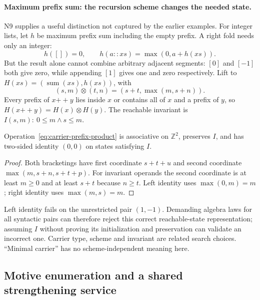 \paragraph{Maximum prefix sum: the recursion scheme changes the needed state.}
\label{sec:carrier-prefix-sum}
N9 supplies a useful distinction not captured by the earlier examples. For
integer lists, let $h$ be maximum prefix sum including the empty prefix. A
right fold needs only an integer:
\[
 h([])=0,\qquad h(a::xs)=\max(0,a+h(xs)).
\]
But the result alone cannot combine arbitrary adjacent segments: $[0]$ and
$[-1]$ both give zero, while appending $[1]$ gives one and zero respectively.
Lift to $H(xs)=(\operatorname{sum}(xs),h(xs))$, with
\begin{equation}\label{eq:carrier-prefix-product}
 (s,m)\otimes(t,n)=(s+t,\max(m,s+n)).
\end{equation}
Every prefix of $x\mathbin{+\!+}y$ lies inside $x$ or contains all of $x$
and a prefix of $y$, so $H(x\mathbin{+\!+}y)=H(x)\otimes H(y)$.
The reachable invariant is $I(s,m):\ 0\le m\land s\le m$.

\begin{proposition}
\label{prop:carrier-prefix-monoid}
Operation~\eqref{eq:carrier-prefix-product} is associative on $\mathbb Z^2$,
preserves $I$, and has two-sided identity $(0,0)$ on states satisfying $I$.
\end{proposition}
\begin{proof}
Both bracketings have first coordinate $s+t+u$ and second coordinate
$\max(m,s+n,s+t+p)$. For invariant operands the second coordinate is at least
$m\ge0$ and at least $s+t$ because $n\ge t$. Left identity uses
$\max(0,m)=m$; right identity uses $\max(m,s)=m$.
\end{proof}

Left identity fails on the unrestricted pair $(1,-1)$. Demanding algebra laws
for all syntactic pairs can therefore reject this correct reachable-state
representation; assuming $I$ without proving its initialization and preservation
can validate an incorrect one. Carrier type, scheme and invariant are related
search choices. ``Minimal carrier'' has no scheme-independent meaning here.

\subsection{Motive enumeration and a shared strengthening service}
\label{sec:carrier-motives}

